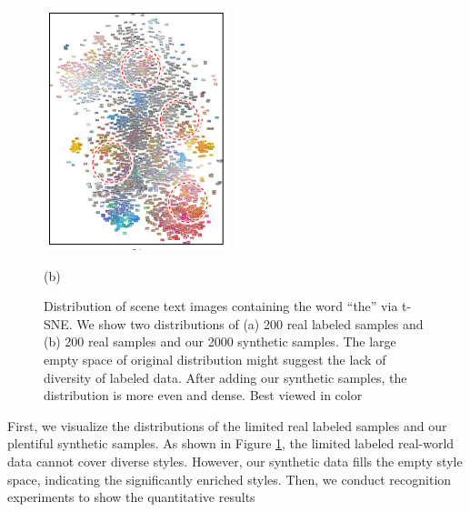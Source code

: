 \documentclass{article}
\begin{document}
\begin{multicols}{2}
\begin{figure}[H]
\begin{minipage}[b]{0.23\textwidth}
         \includegraphics[width=\textwidth]{6.png}
         \caption*{(b)}
         \label{fig:Figure_6}
     \end{minipage}
    

        \caption{Distribution of scene text images containing the word
“the” via t-SNE. We show two distributions of (a) 200 real labeled
samples and (b) 200 real samples and our 2000 synthetic samples.
The large empty space of original distribution might suggest the
lack of diversity of labeled data. After adding our synthetic samples, the distribution is more even and dense. Best viewed in color}
         \label{fig:whole_5}

 \end{figure}

 First, we visualize the distributions of the limited real
labeled samples and our plentiful synthetic samples. As
shown in Figure \ref{fig:whole_5}, the limited labeled real-world data cannot cover diverse styles. However, our synthetic data fills
the empty style space, indicating the significantly enriched
styles. Then, we conduct recognition experiments to show
the quantitative results


\end{multicols}
\end{document}
